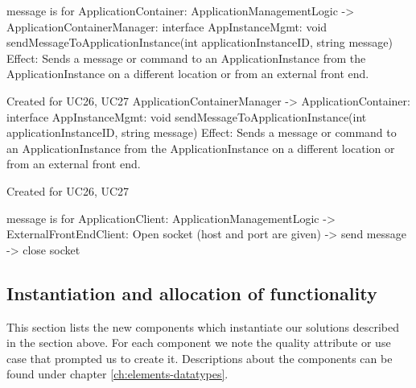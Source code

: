                 message is for ApplicationContainer:
                    ApplicationManagementLogic -> ApplicationContainerManager: interface AppInstanceMgmt: void sendMessageToApplicationInstance(int applicationInstanceID, string message)
                        Effect: Sends a message or command to an ApplicationInstance from the ApplicationInstance on a different location or from an external front end.
                        \item Created for UC26, UC27
                    ApplicationContainerManager -> ApplicationContainer: interface AppInstanceMgmt: void sendMessageToApplicationInstance(int applicationInstanceID, string message)
                        Effect: Sends a message or command to an ApplicationInstance from the ApplicationInstance on a different location or from an external front end.
                        \item Created for UC26, UC27

                message is for ApplicationClient:
                    ApplicationManagementLogic -> ExternalFrontEndClient: Open socket (host and port are given) -> send message -> close socket

\subsection{Instantiation and allocation of functionality}
    This section lists the new components which instantiate our solutions
    described in the section above. For each component we note the quality
    attribute or use case that prompted us to create it. Descriptions about
    the components can be found under chapter \ref{ch:elements-datatypes}. \\

